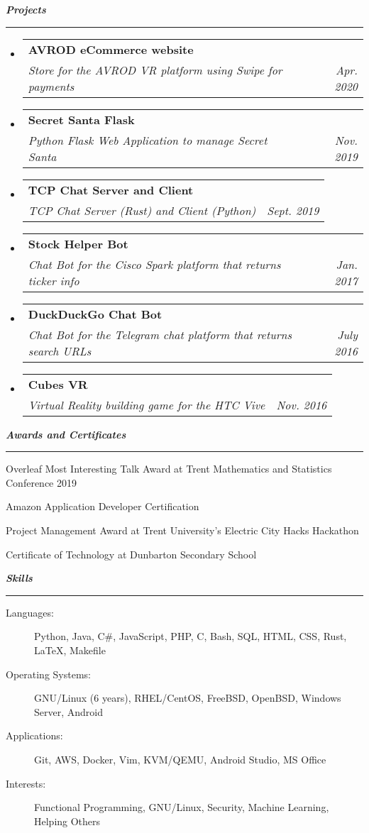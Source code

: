 \documentclass[letterpaper,11pt]{article}
\makeatletter
\newcommand{\mysection}[1]{\vspace{5pt} {\bfseries \textsl{#1}} \\ {\color{gray} \rule[5pt]{\textwidth}{1pt}}}
\newcommand{\ressubheading}[4]{\begin{tabular*}{6.5in}{l@{\extracolsep{\fill}}r}
        \textbf{#1} & #2 \\
        \textit{#3} & \textit{#4} \\
\end{tabular*}\vspace{-6pt}}
\makeatother
\begin{document}
\mysection{Projects}
\begin{itemize}
    \item
        \ressubheading{AVROD eCommerce website}{}{Store for the AVROD VR platform using Swipe for payments}{Apr. 2020}
    \item
        \ressubheading{Secret Santa Flask}{}{Python Flask Web Application to manage Secret Santa}{Nov. 2019}
    \item
        \ressubheading{TCP Chat Server and Client}{}{TCP Chat Server (Rust) and Client (Python)}{Sept. 2019}
    \item
        \ressubheading{Stock Helper Bot}{}{Chat Bot for the Cisco Spark platform that returns ticker info}{Jan. 2017}
    \item
        \ressubheading{DuckDuckGo Chat Bot}{}{Chat Bot for the Telegram chat platform that returns search URLs}{July 2016}
    \item
        \ressubheading{Cubes VR}{}{Virtual Reality building game for the HTC Vive}{Nov. 2016}

\end{itemize}

\mysection{Awards and Certificates}
\begin{description}
    \item Overleaf Most Interesting Talk Award at Trent Mathematics and Statistics Conference 2019
    \item Amazon Application Developer Certification
    \item Project Management Award at Trent University's Electric City Hacks Hackathon
    \item Certificate of Technology at Dunbarton Secondary School
\end{description}

\mysection{Skills}
\begin{description}
    \item[Languages:]
        Python, Java, C\#, JavaScript, PHP, C, Bash, SQL, HTML, CSS, Rust, \LaTeX{}, Makefile
    \item[Operating Systems:]
        GNU/Linux (6 years), RHEL/CentOS, FreeBSD, OpenBSD, Windows Server, Android
    \item[Applications:]
        Git, AWS, Docker, Vim, KVM/QEMU, Android Studio, MS Office
    \item[Interests:]
        Functional Programming, GNU/Linux, Security, Machine Learning, Helping Others
\end{description}
\end{document}
